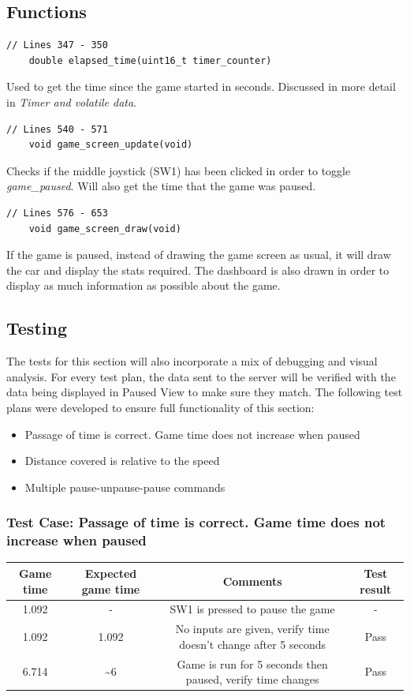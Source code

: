 \documentclass{article}
\begin{document}
\subsection*{Functions}
\begin{lstlisting}[style=CStyle]
	// Lines 347 - 350
	double elapsed_time(uint16_t timer_counter)
\end{lstlisting}
Used to get the time since the game started in seconds. Discussed in more detail in \emph{Timer and volatile data}.
\begin{lstlisting}[style=CStyle]
	// Lines 540 - 571
	void game_screen_update(void)
\end{lstlisting}
Checks if the middle joystick (SW1) has been clicked in order to toggle \emph{game\_paused}. Will also get the time that the game was paused.
\begin{lstlisting}[style=CStyle]
	// Lines 576 - 653
	void game_screen_draw(void)
\end{lstlisting}
If the game is paused, instead of drawing the game screen as usual, it will draw the car and display the stats required. The dashboard is also drawn in order to display as much information as possible about the game.
\newpage

\subsection*{Testing}
The tests for this section will also incorporate a mix of debugging and visual analysis. For every test plan, the data sent to the server will be verified with the data being displayed in Paused View to make sure they match. The following test plans were developed to ensure full functionality of this section: 
\begin{itemize}
	\item Passage of time is correct. Game time does not increase when paused
	\item Distance covered is relative to the speed 
	\item Multiple pause-unpause-pause commands
\end{itemize}
\subsubsection*{Test Case: Passage of time is correct. Game time does not increase when paused}
\begin{center}
\begin{tabular}{ c c c c }
Game time	& Expected game time	& Comments									& Test result	\\ \hline
1.092		& - 				& SW1 is pressed to pause the game					& - 		\\
1.092		& 1.092			& No inputs are given, verify time doesn't change after 5 seconds  & Pass	\\
6.714		& \textasciitilde 6		& Game is run for 5 seconds then paused, verify time changes	& Pass	\\ \hline
\end{tabular}
\end{center}
\end{document}
